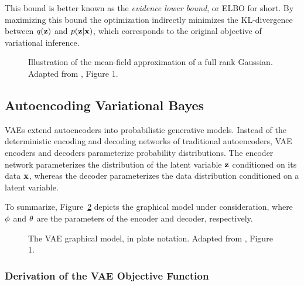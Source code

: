 This bound is better known as the \textit{evidence lower bound}, or ELBO for short. By maximizing this bound the optimization indirectly minimizes the KL-divergence between $q(\mathbf{z})$ and $p(\mathbf{z} \vert \mathbf{x})$, which corresponds to the original objective of variational inference.


\begin{figure}[!htb]
  \centering
  \resizebox{0.5\textwidth}{!}{\unskip}
  \caption{Illustration of the mean-field approximation of a full rank Gaussian. Adapted from \cite{variational_inference_review}, Figure 1.}
  \label{fig:mean_field_approximation}
\end{figure}

\subsection{Autoencoding Variational Bayes}

VAEs extend autoencoders into probabilistic generative models. Instead of the deterministic encoding and decoding networks of traditional autoencoders, VAE encoders and decoders parameterize probability distributions. The encoder network parameterizes the distribution of the latent variable $\mathbf{z}$ conditioned on its data $\mathbf{x}$, whereas the decoder parameterizes the data distribution conditioned on a latent variable.


To summarize, Figure~\ref{fig:aevb_plate_notation} depicts the graphical model under consideration, where $\phi$ and $\theta$ are the parameters of the encoder and decoder, respectively.

\begin{figure}[!htb]
  \centering
  \resizebox{0.3\textwidth}{!}{\unskip}
  \caption{The VAE graphical model, in plate notation. Adapted from \cite{aevb}, Figure 1.}
  \label{fig:aevb_plate_notation}
\end{figure}

\subsubsection{Derivation of the VAE Objective Function}

